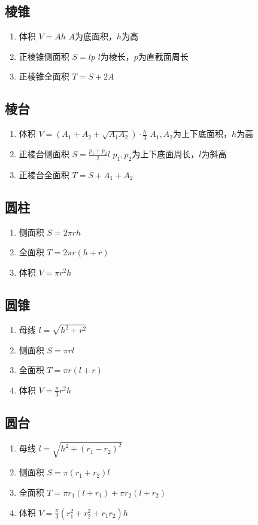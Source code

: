 	\subsection{棱锥}
		\begin{enumerate}\setlength{\itemsep}{-\itemsep}
			\item 体积
				$V=Ah$
				$A$为底面积，$h$为高
			\item 正棱锥侧面积
				$S=lp$
				$l$为棱长，$p$为直截面周长
			\item 正棱锥全面积
				$T=S+2A$
		\end{enumerate}
	\subsection{棱台}
		\begin{enumerate}\setlength{\itemsep}{-\itemsep}
			\item 体积
				$V=(A_1+A_2+\sqrt{A_1A_2}) \cdot \frac{h}{3}$
				$A_1,A_2$为上下底面积，$h$为高
			\item 正棱台侧面积
				$S=\frac{p_1+p_2}{2}l$
				$p_1,p_2$为上下底面周长，$l$为斜高
			\item 正棱台全面积
				$T=S+A_1+A_2$
		\end{enumerate}
	\subsection{圆柱}
		\begin{enumerate}\setlength{\itemsep}{-\itemsep}
			\item 侧面积
				$S=2\pi rh$
			\item 全面积
				$T=2\pi r(h+r)$
			\item 体积
				$V=\pi r^2h$
		\end{enumerate}
	\subsection{圆锥}
		\begin{enumerate}\setlength{\itemsep}{-\itemsep}
			\item 母线
				$l=\sqrt{h^2+r^2}$
			\item 侧面积
				$S=\pi rl$
			\item 全面积
				$T=\pi r(l+r)$
			\item 体积
				$V=\frac{\pi}{3} r^2h$
		\end{enumerate}
	\subsection{圆台}
		\begin{enumerate}\setlength{\itemsep}{-\itemsep}
			\item 母线
				$l=\sqrt{h^2+(r_1-r_2)^2}$
			\item 侧面积
				$S=\pi(r_1+r_2)l$
			\item 全面积
				$T=\pi r_1(l+r_1)+\pi r_2(l+r_2)$
			\item 体积
				$V=\frac{\pi}{3}(r_1^2+r_2^2+r_1r_2)h$
		\end{enumerate}

